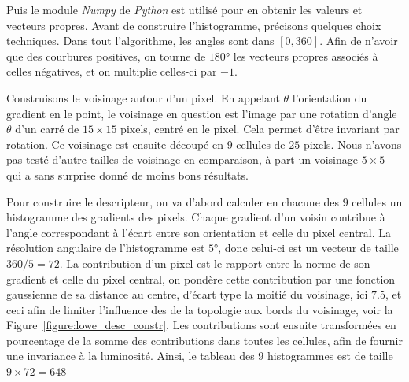 \documentclass[
	a4paper, %
	10pt, %
	unnumberedsections, %
	twoside, %
]{LTJournalArticle}
\begin{document}
Puis le module \textit{Numpy} de \textit{Python} est utilisé pour en obtenir les valeurs et vecteurs
propres.
Avant de construire l'histogramme, précisons quelques choix techniques.
Dans tout l'algorithme, les angles sont dans $[0, 360]$. Afin de n'avoir que des
courbures positives, on tourne de $180$° les vecteurs propres associés à celles
négatives, et on multiplie celles-ci par $-1$.

Construisons le voisinage autour d'un pixel. En appelant $\theta$
l'orientation du gradient en le point, le voisinage en question est l'image par
une rotation d'angle $\theta$ d'un carré de $15\times 15$ pixels,
centré en le pixel. Cela permet d'être invariant par rotation.
Ce voisinage est ensuite découpé en $9$ cellules de $25$ pixels.
Nous n'avons pas testé d'autre tailles de voisinage en comparaison, à
part un voisinage $5 \times 5$ qui a sans surprise donné de moins bons résultats.

Pour construire le descripteur, on va d'abord
calculer en chacune des $9$ cellules un histogramme des gradients des pixels.
Chaque gradient d'un voisin contribue à
l'angle correspondant à l'écart entre son orientation et celle du pixel central.
La résolution angulaire de l'histogramme est $5$°, donc celui-ci est un vecteur de taille
$360 / 5 = 72$.
La contribution d'un pixel
est le rapport entre la norme de son gradient et celle du pixel central,
on pondère cette contribution par une fonction gaussienne de sa distance au centre,
d'écart type la moitié du voisinage, ici $7.5$, et ceci afin de limiter l'influence des
de la topologie aux bords du voisinage, voir la Figure~\ref{figure:lowe_desc_constr}.
Les contributions sont ensuite transformées en pourcentage
de la somme des contributions dans toutes les cellules, afin de fournir une invariance
à la luminosité. Ainsi, le tableau des $9$ histogrammes est de taille $9 \times 72 = 648$
\end{document}
